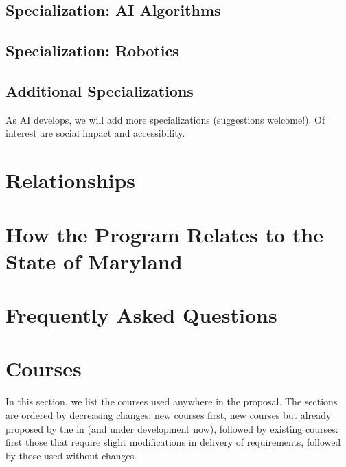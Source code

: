 \documentclass[
10pt, %
a4paper, %
oneside, %
headinclude,footinclude, %
BCOR5mm, %
]{scrartcl}
\begin{document}


\subsection{Specialization: AI Algorithms}



\subsection{Specialization: Robotics}



\subsection{Additional Specializations}

As AI develops, we will add more specializations (suggestions welcome!).  Of interest are social impact and accessibility.

\section{Relationships}




\section{How the Program Relates to the State of Maryland}



\section{Frequently Asked Questions}



  \section{Courses}

In this section, we list the courses used anywhere in the proposal.  The sections are ordered by decreasing changes: new courses first, new courses but already proposed by the  in  (and under development now), followed by existing courses: first those that require slight modifications in delivery of requirements, followed by those used without changes.  
\end{document}
